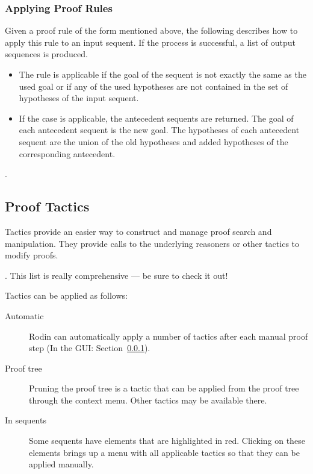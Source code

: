 \subsubsection{Applying Proof Rules}

Given a proof rule of the form mentioned above, the following describes how to apply this rule to an input sequent. If the process is successful, a list of output sequences is produced. 

\begin{itemize}
	\item The rule is applicable if the goal of the sequent is not exactly the same as the used goal or if any of the used hypotheses are not contained in the set of hypotheses of the input sequent. 
	\item If the case is applicable, the antecedent sequents are returned. The goal of each antecedent sequent is the new goal. The hypotheses of each antecedent sequent are the union of the old hypotheses and added hypotheses of the corresponding antecedent. 
\end{itemize}

.

\subsection{Proof Tactics}
\label{proof_tactics}

Tactics provide an easier way to construct and manage proof search and manipulation. They provide calls to the underlying reasoners or other tactics to modify proofs.

.  This list is really comprehensive --- be sure to check it out!

Tactics can be applied as follows:

\begin{description}
	\item[Automatic] Rodin can automatically apply a number of tactics after each manual proof step (In the GUI: Section~\ref{}).
	\item[Proof tree] Pruning the proof tree is a tactic that can be applied from the proof tree through the context menu.  Other tactics may be available there.
	\item[In sequents] Some sequents have elements that are highlighted in red.  Clicking on these elements brings up a menu with all applicable tactics so that they can be applied manually.
\end{description}

